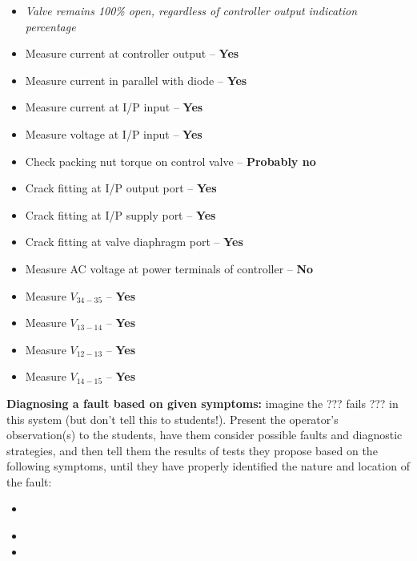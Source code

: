 \begin{itemize}
\item{} {\it Valve remains 100\% open, regardless of controller output indication percentage}
\item{} Measure current at controller output -- {\bf Yes}
\item{} Measure current in parallel with diode -- {\bf Yes}
\item{} Measure current at I/P input -- {\bf Yes}
\item{} Measure voltage at I/P input -- {\bf Yes}
\item{} Check packing nut torque on control valve -- {\bf Probably no}
\item{} Crack fitting at I/P output port -- {\bf Yes}
\item{} Crack fitting at I/P supply port -- {\bf Yes}
\item{} Crack fitting at valve diaphragm port -- {\bf Yes}
\item{} Measure AC voltage at power terminals of controller -- {\bf No}
\item{} Measure $V_{34-35}$ -- {\bf Yes}
\item{} Measure $V_{13-14}$ -- {\bf Yes}
\item{} Measure $V_{12-13}$ -- {\bf Yes}
\item{} Measure $V_{14-15}$ -- {\bf Yes}
\end{itemize}


\vskip 10pt


\noindent
{\bf Diagnosing a fault based on given symptoms:} imagine the ??? fails ??? in this system (but don't tell this to students!).  Present the operator's observation(s) to the students, have them consider possible faults and diagnostic strategies, and then tell them the results of tests they propose based on the following symptoms, until they have properly identified the nature and location of the fault:

\begin{itemize}
\item{} {\it }
\item{} 
\item{} 
\end{itemize}





